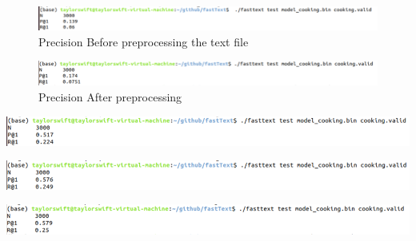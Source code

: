 \documentclass[a4paper,1pt]{article}
\begin{document}
\begin{figure}[h]
	\centering

\label{fig:precision-and-recall-at-position-10}
\includegraphics[width=1.0\linewidth]{"Precision and Recall at position 10"}
\caption{Precision Before preprocessing the text file}
\end{figure}

\begin{figure}[h]
	\centering

	\label{fig:Precision and Recall at position 11}
	\includegraphics[width=1.0\linewidth]{"screenshot002"}
		\caption{	Precision After preprocessing}
\end{figure}



\begin{center}
	\begin{minipage}{\linewidth}
		\centering
		\includegraphics[width=1.0\linewidth]{"Precision and Recall at position 13"}
	\end{minipage}
\end{center}


\begin{center}
	\begin{minipage}{\linewidth}
		\centering
		\includegraphics[width=1.0\linewidth]{"Precision and Recall at position 14"}
	\end{minipage}
\end{center}


\begin{center}
	\begin{minipage}{\linewidth}
		\centering
		\includegraphics[width=1.0\linewidth]{"Precision and Recall at position 15"}
	\end{minipage}
\end{center}
\end{document}
